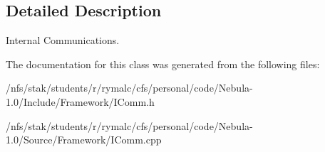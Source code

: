 \subsection{Detailed Description}
Internal Communications. 

The documentation for this class was generated from the following files:\begin{DoxyCompactItemize}
\item 
/nfs/stak/students/r/rymalc/cfs/personal/code/Nebula-\/1.0/Include/Framework/IComm.h\item 
/nfs/stak/students/r/rymalc/cfs/personal/code/Nebula-\/1.0/Source/Framework/IComm.cpp\end{DoxyCompactItemize}

